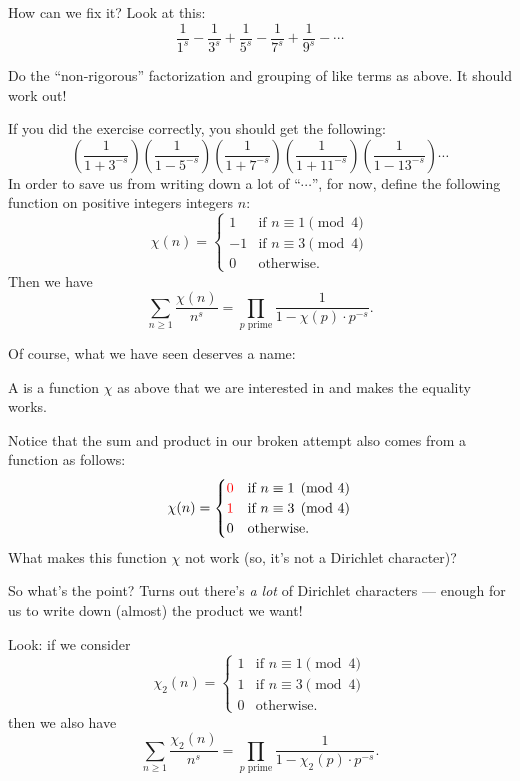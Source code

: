 How can we fix it? Look at this:
\[
	\frac{1}{1^s} - \frac{1}{3^s} + \frac{1}{5^s} - \frac{1}{7^s} + \frac{1}{9^s} - \cdots
\]
\begin{exercise}
	Do the ``non-rigorous'' factorization and grouping of like terms as above. It should work out!
\end{exercise}

If you did the exercise correctly, you should get the following:
\[
	\left( \frac{1}{1+3^{-s}}\right)
	\left( \frac{1}{1-5^{-s}}\right)
	\left( \frac{1}{1+7^{-s}}\right)
	\left( \frac{1}{1+11^{-s}}\right)
	\left( \frac{1}{1-13^{-s}}\right) \cdots
\]
In order to save us from writing down a lot of ``$\cdots$'', for now, define the following function
on positive integers integers $n$:
\[ \chi(n) = \begin{cases}
	1 &\text{if }n \equiv 1 \pmod{4} \\
	-1&\text{if }n \equiv 3 \pmod{4} \\
	0 &\text{otherwise.}
\end{cases} \]
Then we have
\[ \sum_{n \geq 1} \frac{\chi(n)}{n^s} = \prod_{p\text{ prime}} \frac{1}{1-\chi(p) \cdot p^{-s}}. \]

Of course, what we have seen deserves a name:
\begin{definition}
	A  is a function $\chi$ as above that we are interested in and makes
	the equality works.
\end{definition}

\begin{exercise}
	Notice that the sum and product in our broken attempt also comes from a function as follows:
	\[ \chi(n) = \begin{cases}
		\textcolor{red}{0} &\text{if }n \equiv 1 \pmod{4} \\
		\textcolor{red}{1} &\text{if }n \equiv 3 \pmod{4} \\
		0 &\text{otherwise.}
	\end{cases} \]
	What makes this function $\chi$ not work (so, it's not a Dirichlet character)?
\end{exercise}

So what's the point? Turns out there's \emph{a lot} of Dirichlet characters ---
enough for us to write down (almost) the product we want!

Look: if we consider
\[ \chi_2(n) = \begin{cases}
	1 &\text{if }n \equiv 1 \pmod{4} \\
	1 &\text{if }n \equiv 3 \pmod{4} \\
	0 &\text{otherwise.}
\end{cases} \]
then we also have
\[ \sum_{n \geq 1} \frac{\chi_2(n)}{n^s} =
\prod_{p\text{ prime}} \frac{1}{1-\chi_2(p) \cdot p^{-s}}. \]

